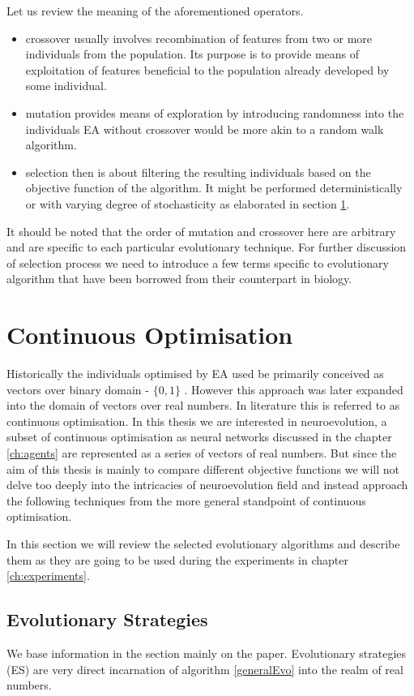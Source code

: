 Let us review the meaning of the aforementioned operators.
\begin{itemize}
	\item crossover usually involves recombination of features from two or more individuals from the population. Its purpose is to provide means of exploitation of features beneficial to the population already developed by some individual.
	\item mutation provides means of exploration by introducing randomness into the individuals
	EA without crossover would be more akin to a random walk algorithm.
	\item selection then is about filtering the resulting individuals based on the objective function of the algorithm. It might be performed deterministically or with varying degree of stochasticity as elaborated in section \ref{continuousOpt}.
\end{itemize}
It should be noted that the order of mutation and crossover here are arbitrary and are specific to each particular evolutionary technique.  
For further discussion of selection process we need to introduce a few terms specific to evolutionary algorithm that have been borrowed from their counterpart in biology.


\section{Continuous Optimisation }
\label{continuousOpt}
Historically the individuals optimised by EA used be primarily conceived as vectors over binary domain - $\lbrace 0, 1 \rbrace$ . However this approach was  later expanded into the domain of vectors over real numbers. In literature this is referred to as continuous optimisation. In this thesis we are interested in neuroevolution, a subset of continuous optimisation as neural networks discussed in the chapter \ref{ch:agents} are represented as a series of vectors of real numbers. But since the aim of this thesis is mainly to compare different objective functions we will not delve too deeply into the intricacies of neuroevolution field and instead approach the following techniques from the more general standpoint of continuous optimisation.

In this section we will review the selected evolutionary algorithms and describe them as they are going to be used during the experiments in chapter \ref{ch:experiments}.
\subsection{Evolutionary Strategies}
\label{sec:ES}
We base information in the section mainly on the \citep{evoStrategy} paper.
Evolutionary strategies (ES) are very direct incarnation of algorithm \ref{generalEvo} into the realm of real numbers. 


